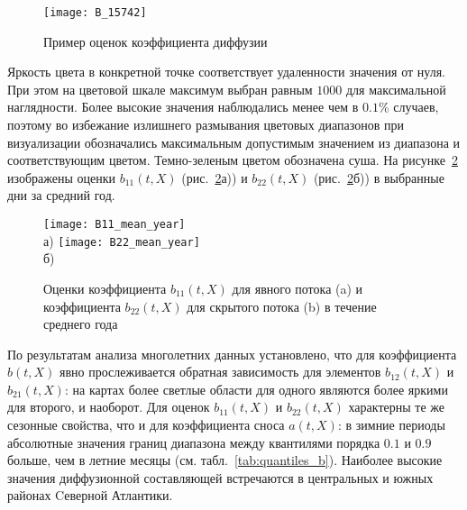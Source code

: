 \begin{figure}[h!]
	\centering
	\texttt{[image: B\_15742]}
	\caption{Пример оценок коэффициента диффузии} 
	\label{fig:b_example}
\end{figure}

Яркость цвета в конкретной точке соответствует удаленности значения от нуля. При этом на цветовой шкале максимум выбран равным $1000$ для максимальной наглядности. Более высокие значения наблюдались менее чем в $0.1\%$ случаев, поэтому во избежание излишнего размывания цветовых диапазонов при визуализации обозначались максимальным допустимым значением из диапазона и соответствующим цветом. Темно-зеленым цветом обозначена суша. На рисунке~\ref{fig:b_mean_year} изображены оценки $b_{11}(t,X)$ (рис.~\ref{fig:b_mean_year}а)) и $b_{22}(t,X)$ (рис.~\ref{fig:b_mean_year}б)) в выбранные дни за средний год.


\begin{figure}[!h]
	\centering
	\texttt{[image: B11\_mean\_year]}\\
	а)
	\texttt{[image: B22\_mean\_year]}
	\\
	б)
	
	\caption{Оценки коэффициента $b_{11}(t,X)$ для явного потока (a) и коэффициента $b_{22}(t,X)$ для скрытого потока (b) в течение среднего года}
	\label{fig:b_mean_year}
\end{figure} 

По результатам анализа многолетних данных установлено, что для коэффициента $b(t,X)$ явно прослеживается обратная зависимость для элементов $b_{12}(t,X)$ и $b_{21}(t,X)$: на картах более светлые области для одного являются более яркими для второго, и наоборот. Для оценок $b_{11}(t,X)$ и $b_{22}(t,X)$ характерны те же сезонные свойства, что и для коэффициента сноса $a(t,X)$: в зимние периоды абсолютные значения границ диапазона между квантилями порядка $0.1$ и $0.9$ больше, чем в летние месяцы (см. табл.~\ref{tab:quantiles_b}). Наиболее высокие значения диффузионной составляющей встречаются в центральных и южных районах Cеверной Атлантики. 

